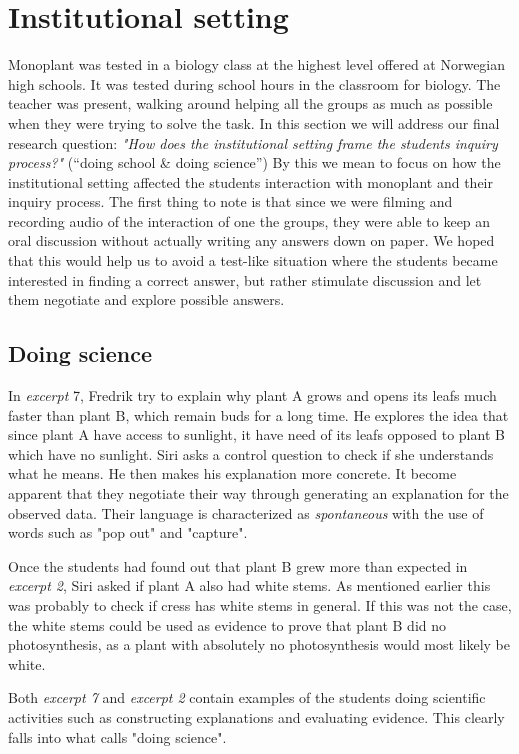 \section{Institutional setting}
Monoplant was tested in a biology class at the highest level offered at Norwegian high schools. It was tested during school hours in the classroom for biology. The teacher was present, walking around helping all the groups as much as possible when they were trying to solve the task. In this section we will address our final research question: \emph{"How does the institutional setting frame the students inquiry process?"} (“doing school \& doing science”)
By this we mean to focus on how the institutional setting affected the students interaction with monoplant and their inquiry process. The first thing to note is that since we were filming and recording audio of the interaction of one the groups, they were able to keep an oral discussion without actually writing any answers down on paper. We hoped that this would help us to avoid a test-like situation where the students became interested in finding a correct answer, but rather stimulate discussion and let them negotiate and explore possible answers.



\subsection{Doing science}
In \emph{excerpt} 7, Fredrik try to explain why plant A grows and opens its leafs much faster than plant B, which remain buds for a long time. He explores the idea that since plant A have access to sunlight, it have need of its leafs opposed to plant B which have no sunlight. Siri asks a control question to check if she understands what he means. He then makes his explanation more concrete. It become apparent that they negotiate their way through generating an explanation for the observed data. Their language is characterized as \emph{spontaneous} with the use of words such as "pop out" and "capture". 

Once the students had found out that plant B grew more than expected in \emph{excerpt 2}, Siri asked if plant A also had white stems. As mentioned earlier this was probably to check if cress has white stems in general. If this was not the case, the white stems could be used as evidence to prove that plant B did no photosynthesis, as a plant with absolutely no photosynthesis would most likely be white. 

Both \emph{excerpt 7} and \emph{excerpt 2} contain examples of the students doing scientific activities such as constructing explanations and evaluating evidence. This clearly falls into what \citet{jimenez2000doing} calls "doing science".

